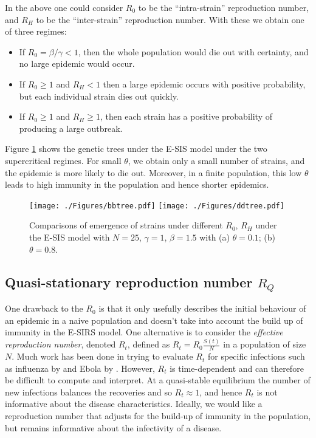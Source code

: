 \documentclass[smallextended]{svjour3}       %
\begin{document}
In the above one could consider $R_0$ to be the ``intra-strain'' reproduction number, and $R_H$ to be the ``inter-strain'' reproduction number. With these we obtain one of three regimes:
\begin{itemize}
	\item If $R_0 = \beta/\gamma < 1$, then the whole population would die out with certainty, and no large epidemic would occur.
	\item If $R_0 \geq 1$ and $R_H < 1$ then a large epidemic occurs with positive probability, but each individual strain dies out quickly.
	\item If $R_0 \geq 1$ and $R_H \geq 1$, then each strain has a positive probability of producing a large outbreak.
\end{itemize}
Figure \ref{fig: tree} shows the genetic trees under the E-SIS model under the two supercritical regimes. For small $\theta$, we obtain only a small number of strains, and the epidemic is more likely to die out. Moreover, in a finite population, this low $\theta$ leads to high immunity in the population and hence shorter epidemics.

\begin{figure}[h!]
	\centering
 		\texttt{[image: ./Figures/bbtree.pdf]}
 		\texttt{[image: ./Figures/ddtree.pdf]}
	\caption{Comparisons of emergence of strains under different $R_0$, $R_H$ under the E-SIS model with $N=25$, $\gamma = 1$, $\beta = 1.5$ with (a) $\theta=0.1$; (b) $\theta=0.8$.}
	\label{fig: tree}
\end{figure}

\subsection{Quasi-stationary reproduction number $R_Q$}\label{subsec: rt}
One drawback to the $R_0$ is that it only usefully describes the initial behaviour of an epidemic in a naive population and doesn't take into account the build up of immunity in the E-SIRS model. One alternative is to consider the \emph{effective reproduction number}, denoted $R_t$, defined as $R_t = R_0 \frac{S(t)}{N}$ in a population of size $N$. Much work has been done in trying to evaluate $R_t$ for specific infections such as influenza by \cite{cowling2010} and Ebola by \cite{althaus2014}. However, $R_t$ is time-dependent and can therefore be difficult to compute and interpret. At a quasi-stable equilibrium the number of new infections balances the recoveries and so $R_t\approx 1$, and hence $R_t$ is not informative about the disease characteristics. Ideally, we would like a reproduction number that adjusts for the build-up of immunity in the population, but remains informative about the infectivity of a disease. 
\end{document}
